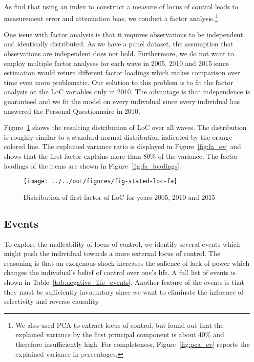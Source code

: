 \documentclass[12pt, a4paper, fleqn, parskip]{scrartcl}
\begin{document}
As \citet{piatek2016} find that using an index to construct a measure of locus
of control leads to measurement error and attenuation bias, we conduct a factor
analysis.\footnote{We also used PCA to extract locus of control, but found out
that the explained variance by the first principal component is about 40\% and
therefore insufficiently high. For completeness, Figure~\ref{fig:pca_ev}
reports the explained variance in percentages.}

One issue with factor analysis is that it requires observations to be
independent and identically distributed. As we have a panel dataset, the
assumption that observations are independent does not hold. Furthermore, we do
not want to employ multiple factor analyses for each wave in 2005, 2010 and
2015 since estimation would return different factor loadings which makes
comparison over time even more problematic. Our solution to this problem is to
fit the factor analysis on the LoC variables only in 2010. The advantage is
that independence is guaranteed and we fit the model on every individual since
every individual has answered the Personal Questionnaire in 2010.

Figure~\ref{fig:stated_loc} shows the resulting distribution of LoC over all
waves. The distribution is roughly similar to a standard normal distribution
indicated by the orange colored line. The explained variance ratio is displayed
in Figure~\ref{fig:fa_ev} and shows that the first factor explains more than
80\% of the variance. The factor loadings of the items are shown in
Figure~\ref{fig:fa_loadings}.

\begin{figure}[H]
    \centering
    \texttt{[image: ../../out/figures/fig-stated-loc-fa]}
    \caption{Distribution of first factor of LoC for years 2005, 2010 and 2015}
    \label{fig:stated_loc}
\end{figure}



\subsection{Events} %
\label{sub:events}

To explore the malleability of locus of control, we identify several events
which might push the individual towards a more external locus of control. The
reasoning is that an exogenous shock increases the salience of lack of power
which changes the individual's belief of control over one's life. A full list
of events is shown in Table~\ref{tab:negative_life_events}. Another feature of
the events is that they must be sufficiently involuntary since we want to
eliminate the influence of selectivity and reverse causality.
\end{document}

